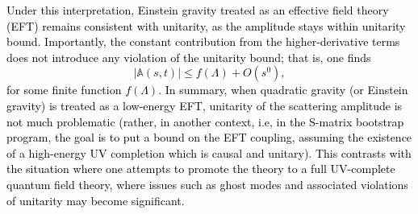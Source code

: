 \textcolor{black}{
Under this interpretation, Einstein gravity treated as an effective field theory (EFT) remains consistent with unitarity, as the amplitude stays within unitarity bound. Importantly, the constant contribution from the higher-derivative terms does not introduce any violation of the unitarity bound; that is, one finds
\begin{equation}
|\mathbb{A}(s,t)| \leq f(\Lambda) + {O}(s^0),
\end{equation}
for some finite function \( f(\Lambda) \).}
\textcolor{black}{
In summary, when quadratic gravity (or Einstein gravity) is treated as a low-energy EFT, unitarity of the scattering amplitude is not much problematic (rather, in another context, i.e, in the S-matrix bootstrap program, the goal is to put a bound on the EFT coupling, assuming the existence of a high-energy UV completion which is causal and unitary). This contrasts with the situation where one attempts to promote the theory to a full UV-complete quantum field theory, where issues such as ghost modes and associated violations of unitarity may become significant.} 

